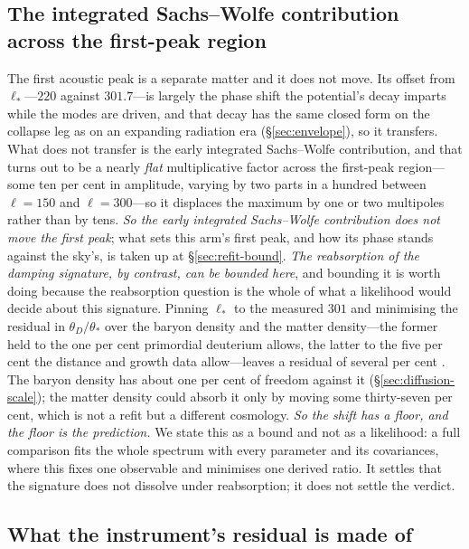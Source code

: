 \documentclass[11pt,a4paper]{article}
\theoremstyle{plain}
\theoremstyle{definition}
\theoremstyle{remark}
\begin{document}
\subsection{The integrated Sachs--Wolfe contribution across the first-peak region}\label{sec:isw}

The first acoustic peak is a separate matter and it does not move. Its offset from $\ell_{*}$---$220$ against
$301.7$---is largely the phase shift the potential's decay imparts while the modes are driven, and that decay
has the same closed form on the collapse leg as on an expanding radiation era (\S\ref{sec:envelope}), so it
transfers. What does not transfer is the early integrated Sachs--Wolfe contribution, and that turns out to be
a nearly \emph{flat} multiplicative factor across the first-peak region---some ten per cent in amplitude,
varying by two parts in a hundred between $\ell=150$ and $\ell=300$---so it displaces the maximum by one or
two multipoles rather than by tens. \emph{So the early integrated Sachs--Wolfe contribution does not move the first peak}; what sets this
arm's first peak, and how its phase stands against the sky's, is taken up at
\S\ref{sec:refit-bound}. \emph{The reabsorption of the damping signature, by contrast, can be bounded here}, and bounding it is
worth doing because the reabsorption question is the whole of what a likelihood would decide about this
signature. Pinning $\ell_{*}$ to the measured $301$ and minimising the residual in $\theta_{D}/\theta_{*}$ over
the baryon density and the matter density---the former held to the one per cent primordial deuterium allows,
the latter to the five per cent the distance and growth data allow---leaves a residual of several per cent
. The baryon density has about one per cent of freedom
against it (\S\ref{sec:diffusion-scale}); the matter density could absorb it only by moving some thirty-seven per cent, which is
not a refit but a different cosmology. \emph{So the shift has a floor, and the floor is the prediction.} We
state this as a bound and not as a likelihood: a full comparison fits the whole spectrum with every parameter
and its covariances, where this fixes one observable and minimises one derived ratio. It settles that the
signature does not dissolve under reabsorption; it does not settle the verdict.

\subsection{What the instrument's residual is made of}\label{sec:residual-decomposition}
\end{document}
